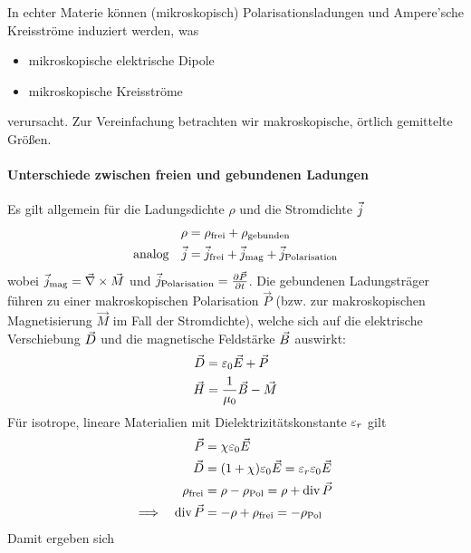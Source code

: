  In echter Materie können (mikroskopisch)
Polarisationsladungen und Ampere'sche Kreisströme induziert werden, was
\begin{itemize}
\item mikroskopische elektrische Dipole
\item mikroskopische Kreisströme
\end{itemize}
verursacht. Zur Vereinfachung betrachten wir makroskopische, örtlich
gemittelte Größen.

\paragraph{Unterschiede zwischen freien und gebundenen Ladungen}
Es gilt allgemein für die Ladungsdichte $\rho$%
 und die
Stromdichte $\vecj$%
\begin{align*}
  \rho&=\rho_\text{frei}+\rho_\text{gebunden}\\
  \text{analog}\quad
  \vecj&=\vecj_\text{frei} + \vecj_\text{mag} + \vecj_\text{Polarisation}
\end{align*}
wobei   
$\vecj_\text{mag} = \vecna\times\vec{M}$ und 
$\vecj_\text{Polarisation}=\dif[\vec{P}]{t}$.
Die gebundenen Ladungsträger führen zu einer makroskopischen
Polarisation $\vec{P}$%
(bzw. zur makroskopischen Magnetisierung $\vec{M}$%
im Fall der Stromdichte), welche sich auf die elektrische
Verschiebung $\vecD$ und die magnetische Feldstärke $\vecB$ auswirkt:
\begin{align*}
  \vecD&=\epso\vecE+\vecP\\
  \vecH&=\frac{1}{\muo}\vecB-\vecM
\end{align*}%
Für isotrope, lineare Materialien mit Dielektrizitätskonstante
$\eps_r$ gilt
\begin{align*}
  \vecP&= \chi \epso\vecE\\
  \vecD&= (1+\chi)\epso\vecE=\eps_r\epso\vecE\\
  \rho_\text{frei}
       &= \rho-\rho_\text{Pol}
         = \rho+\Div\vecP\\
  \Longrightarrow \quad
  \Div\vecP&= -\rho + \rho_\text{frei} = -\rho_\text{Pol}
\end{align*}%
%
Damit ergeben sich

